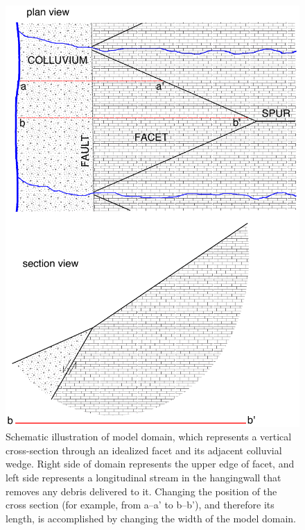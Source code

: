 \begin{figure}[ht!]
\centerline{\includegraphics{Figures/facet_plan_and_profile.pdf}}
\caption{Schematic illustration of model domain, which represents a vertical cross-section through an idealized facet and its adjacent colluvial wedge. Right side of domain represents the upper edge of facet, and left side represents a longitudinal stream in the hangingwall that removes any debris delivered to it. Changing the position of the cross section (for example, from a--a' to b--b'), and therefore its length, is accomplished by changing the width of the model domain.}
\label{fig:domainschematic}
\end{figure}

